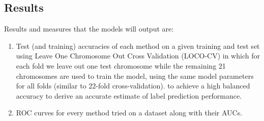 \documentclass[11pt]{article}
\begin{document}
\subsection{Results}
Results and measures that the models will output are:
\begin{enumerate}
	\item Test (and training) accuracies of each method on a given training and test set using Leave One Chromosome Out Cross Validation (LOCO-CV) \cite{Rogers2017,Yang2014,Lippert2011,Listgarten2012} in which for each fold we leave out one test chromosome while the remaining 21 chromosomes are used to train the model, using the same model parameters for all folds (similar to 22-fold cross-validation). to achieve a high balanced accuracy\cite{Brodersen2010} to derive an accurate estimate of label prediction performance.
	\item ROC curves for every method tried on a dataset along with their AUCs.
\end{enumerate}
\end{document}
